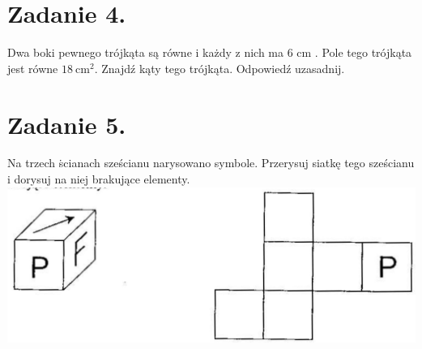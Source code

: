 \documentclass[10pt]{article}
\begin{document}
\section*{Zadanie 4.}
Dwa boki pewnego trójkąta są równe i każdy z nich ma 6 cm . Pole tego trójkąta jest równe \(18 \mathrm{~cm}^{2}\). Znajdź kąty tego trójkąta. Odpowiedź uzasadnij.

\section*{Zadanie 5.}
Na trzech ṡcianach sześcianu narysowano symbole. Przerysuj siatkę tego sześcianu i dorysuj na niej brakujące elementy.\\
\includegraphics[max width=\textwidth, center]{2024_11_21_1724fd187094cf40e180g-1}
\end{document}
